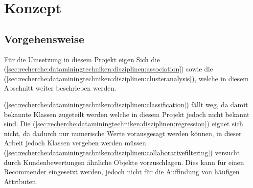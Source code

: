
\chapter{Konzept}
\label{sec:konzept}

\section{Vorgehensweise}
\label{sec:konzept:vorgehensweise}
Für die Umsetzung in diesem Projekt eigen Sich die  (\cref{sec:recherche:dataminingtechniken:disziplinen:association}) sowie die  (\cref{sec:recherche:dataminingtechniken:disziplinen:clusteranalysis}), welche in diesem Abschnitt weiter beschrieben werden.

 (\cref{sec:recherche:dataminingtechniken:disziplinen:classification}) fällt weg, da damit bekannte Klassen zugeteilt werden welche in diesem Projekt jedoch nicht bekannt sind. Die  (\cref{sec:recherche:dataminingtechniken:disziplinen:regression}) eignet sich nicht, da dadurch nur numerische Werte vorausgesagt werden können, in dieser Arbeit jedoch Klassen vergeben werden müssen.  (\cref{sec:recherche:dataminingtechniken:disziplinen:collaborativefiltering}) versucht durch Kundenbewertungen ähnliche Objekte vorzuschlagen. Dies kann für einen Recommender eingesetzt werden, jedoch nicht für die Auffindung von häufigen Attributen.


